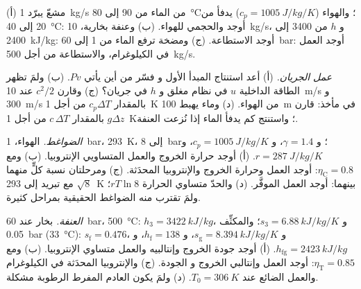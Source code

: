 \begin{exercise}[$\star$]\label{exo:b2:open-systems:4}
(أ) مشعّ يبرّد \qty{1}{kg/s} من الماء من \qty{90}{} إلى \qty{80}{\celsius}؛
والهواء ($c_p = \qty{1005}{J/kg/K}$) يدفأ من \qty{20}{} إلى \qty{40}{\celsius}:
أوجد  والحجمي للهواء. (ب) وعنفة بخارية، \qty{10}{kg/s}،
و $h$ من \qty{3400}{} إلى \qty{2400}{kJ/kg}: أوجد الاستطاعة. (ج) ومضخة ترفع
الماء من \qty{1}{} إلى \qty{60}{bar}: أوجد العمل في الكيلوغرام، والاستطاعة من أجل
\qty{500}{kg/s}.
\end{exercise}

\begin{exercise}[$\star\star$]\label{exo:b2:open-systems:5}
\emph{عمل الجريان.} (أ) أعد استنتاج المبدأ الأول  و
فسّر من أين يأتي $Pv$. (ب) ولمَ تظهر الطاقة الداخلية $u$
في نظام مغلق و $h$ في جريان؟ (ج) وقارن $c^2/2$ عند
\qty{10}{m/s} و \qty{300}{m/s} بالمقدار $c_p\Delta T$ من أجل \qty{1}{K} من الهواء.
(د) وماء يهبط \qty{100}{m} في مأخذ: قارن $g\Delta z$ بالمقدار
$c\,\Delta T$ من أجل \qty{1}{K}؛ واستنتج كم يدفأ الماء إذا
نُزعت العنفة.
\end{exercise}

\begin{exercise}[$\star\star$]\label{exo:b2:open-systems:6}
\emph{الضواغط.} الهواء، \qty{1}{bar}، \qty{293}{K}، إلى \qty{8}{bar}؛ و $\gamma =
1.4$، و $c_p = \qty{1005}{J/kg/K}$، و $r = \qty{287}{J/kg/K}$. (أ) أوجد حرارة
الخروج والعمل المتساويي الإنتروبيا. (ب) ومع $\eta_{\text{C}} = 0.8$: أوجد العمل وحرارة
الخروج والإنتروبيا المحدَثة. (ج) ومرحلتان نسبة كلٍّ منهما $\sqrt8$ مع
تبريد إلى \qty{293}{K} بينهما: أوجد العمل الموفَّر. (د) والحدّ متساوي الحرارة
$rT\ln 8$؛ ولمَ تقترب منه الضواغط الحقيقية بمراحل كثيرة.
\end{exercise}

\begin{exercise}[$\star\star$]\label{exo:b2:open-systems:7}
\emph{العنفة.} بخار عند \qty{60}{bar}، \qty{500}{\celsius}: $h_3 = \qty{3422}{kJ/kg}$،
و $s_3 = \qty{6.88}{kJ/kg/K}$؛ والمكثِّف \qty{0.05}{bar} (\qty{33}{\celsius}):
$s_{\text{f}} = 0.476$، و $s_{\text{g}} = \qty{8.394}{kJ/kg/K}$، و $h_{\text{f}} = 138$،
و $h_{\text{fg}} = \qty{2423}{kJ/kg}$. (أ) أوجد جودة الخروج وإنتالبيه والعمل
متساوي الإنتروبيا. (ب) ومع $\eta_{\text{T}} = 0.85$: أوجد العمل وإنتالبي الخروج و
الجودة. (ج) والإنتروبيا المحدَثة في الكيلوغرام والعمل الضائع عند $T_0 =
\qty{306}{K}$. (د) ولمَ يكون العادم المفرط الرطوبة مشكلة.
\end{exercise}

